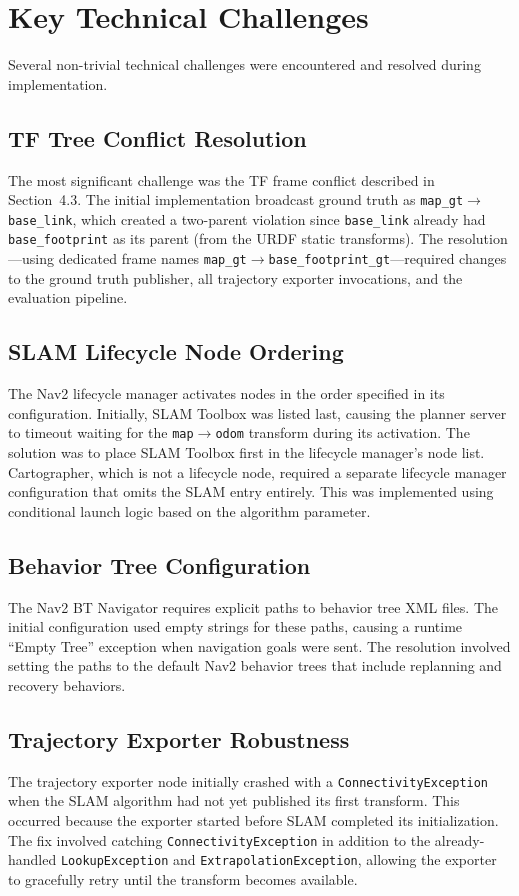\section{Key Technical Challenges}

Several non-trivial technical challenges were encountered and resolved during implementation.

\subsection{TF Tree Conflict Resolution}

The most significant challenge was the TF frame conflict described in Section~4.3. The initial implementation broadcast ground truth as \texttt{map\_gt}$\rightarrow$\texttt{base\_link}, which created a two-parent violation since \texttt{base\_link} already had \texttt{base\_footprint} as its parent (from the URDF static transforms). The resolution---using dedicated frame names \texttt{map\_gt}$\rightarrow$\texttt{base\_footprint\_gt}---required changes to the ground truth publisher, all trajectory exporter invocations, and the evaluation pipeline.

\subsection{SLAM Lifecycle Node Ordering}

The Nav2 lifecycle manager activates nodes in the order specified in its configuration. Initially, SLAM Toolbox was listed last, causing the planner server to timeout waiting for the \texttt{map}$\rightarrow$\texttt{odom} transform during its activation. The solution was to place SLAM Toolbox first in the lifecycle manager's node list. Cartographer, which is not a lifecycle node, required a separate lifecycle manager configuration that omits the SLAM entry entirely. This was implemented using conditional launch logic based on the algorithm parameter.

\subsection{Behavior Tree Configuration}

The Nav2 BT Navigator requires explicit paths to behavior tree XML files. The initial configuration used empty strings for these paths, causing a runtime ``Empty Tree'' exception when navigation goals were sent. The resolution involved setting the paths to the default Nav2 behavior trees that include replanning and recovery behaviors.

\subsection{Trajectory Exporter Robustness}

The trajectory exporter node initially crashed with a \texttt{ConnectivityException} when the SLAM algorithm had not yet published its first transform. This occurred because the exporter started before SLAM completed its initialization. The fix involved catching \texttt{ConnectivityException} in addition to the already-handled \texttt{LookupException} and \texttt{ExtrapolationException}, allowing the exporter to gracefully retry until the transform becomes available.
